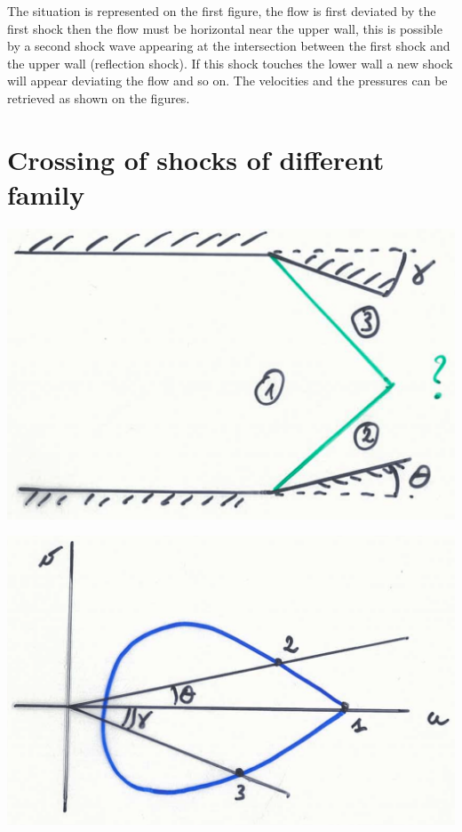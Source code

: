 \begin{center}
\begin{minipage}{0.25\textwidth}
\end{minipage}
\end{center}

The situation is represented on the first figure, the flow is first deviated by the first shock then the flow must be horizontal near the upper wall, this is possible by a second shock wave appearing at the intersection between the first shock and the upper wall (reflection shock). If this shock touches the lower wall a new shock will appear deviating the flow and so on. The velocities and the pressures can be retrieved as shown on the figures. 

\section{Crossing of shocks of different family}
\begin{center}
\begin{minipage}{0.4\textwidth}
\includegraphics[scale=0.15]{ch9/8}
\end{minipage}
\begin{minipage}{0.35\textwidth}
\includegraphics[scale=0.12]{ch9/9}
\end{minipage}
\end{center}

